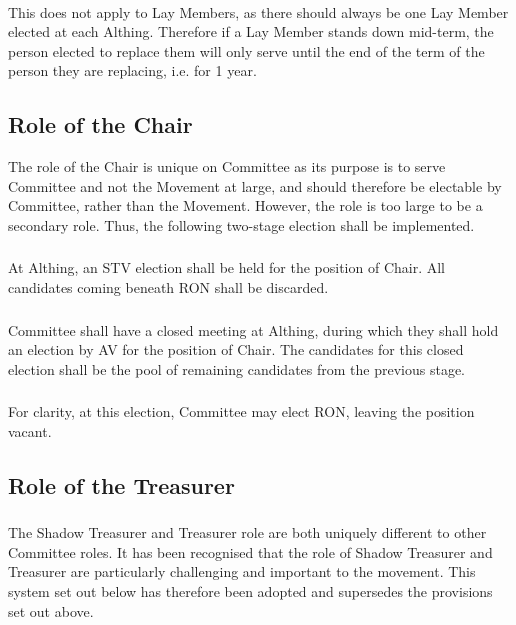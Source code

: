 \documentclass[a4paper, 11pt]{report}
\begin{document}
\paragraph{} This does not apply to Lay Members, as there should always be one Lay Member elected at each Althing. Therefore if a Lay Member stands down mid-term, the person elected to replace them will only serve until the end of the term of the person they are replacing, i.e. for 1 year.

\subsection{Role of the Chair}
\label{sec:chair}

The role of the Chair is unique on Committee as its purpose is to serve Committee and not the Movement at large, and should therefore be electable by Committee, rather than the Movement.  However, the role is too large to be a secondary role.  Thus, the following two-stage election shall be implemented.

\subsubsection{}
At Althing, an STV election shall be held for the position of Chair.  All candidates coming beneath RON shall be discarded.

\subsubsection{}
Committee shall have a closed meeting at Althing, during which they shall hold an election by AV for the position of Chair.  The candidates for this closed election shall be the pool of remaining candidates from the previous stage.

\subsubsection{}
For clarity, at this election, Committee may elect RON, leaving the position vacant.

\subsection{Role of the Treasurer}
\label{sec:treasurer}
\subsubsection{}
The Shadow Treasurer and Treasurer role are both uniquely different to other Committee roles. It has been recognised that the role of Shadow Treasurer and Treasurer are particularly challenging and important to the movement. This system set out below has therefore been adopted and supersedes the provisions set out above.
\end{document}
